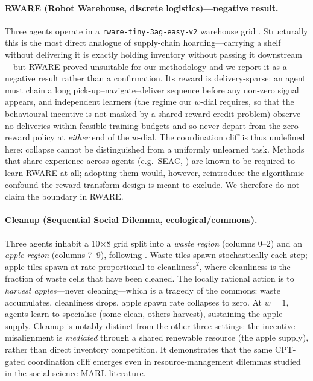 \documentclass[11pt]{article}
\begin{document}
\paragraph{RWARE (Robot Warehouse, discrete logistics)---negative result.}
Three agents operate in a \texttt{rware-tiny-3ag-easy-v2} warehouse grid
\citep{christianos2020shared}.
Structurally this is the most direct analogue of supply-chain hoarding---carrying
a shelf without delivering it is exactly holding inventory without passing it
downstream---but RWARE proved unsuitable for our methodology and we report it as
a negative result rather than a confirmation.
Its reward is delivery-sparse: an agent must chain a long
pick-up--navigate--deliver sequence before any non-zero signal appears, and
independent learners (the regime our $w$-dial requires, so that the behavioural
incentive is not masked by a shared-reward credit problem) observe no deliveries
within feasible training budgets and so never depart from the zero-reward
policy at \emph{either} end of the $w$-dial. The coordination cliff is thus
undefined here: collapse cannot be distinguished from a uniformly unlearned task.
Methods that share experience across agents (e.g.\ SEAC,
\citealp{christianos2020shared}) are known to be required to learn RWARE at all;
adopting them would, however, reintroduce the algorithmic confound the
reward-transform design is meant to exclude. We therefore do not claim the
boundary in RWARE.

\paragraph{Cleanup (Sequential Social Dilemma, ecological/commons).}
Three agents inhabit a 10$\times$8 grid split into a \emph{waste region} (columns
0--2) and an \emph{apple region} (columns 7--9), following \citet{leibo2017multi}.
Waste tiles spawn stochastically each step; apple tiles spawn at rate proportional
to $\text{cleanliness}^2$, where cleanliness is the fraction of waste cells that
have been cleaned.
The locally rational action is to \emph{harvest apples}---never cleaning---which
is a tragedy of the commons: waste accumulates, cleanliness drops, apple spawn
rate collapses to zero.
At $w{=}1$, agents learn to specialise (some clean, others harvest), sustaining
the apple supply.
Cleanup is notably distinct from the other three settings: the incentive
misalignment is \emph{mediated} through a shared renewable resource (the apple
supply), rather than direct inventory competition.
It demonstrates that the same CPT-gated coordination cliff emerges even in
resource-management dilemmas studied in the social-science MARL literature.
\end{document}
